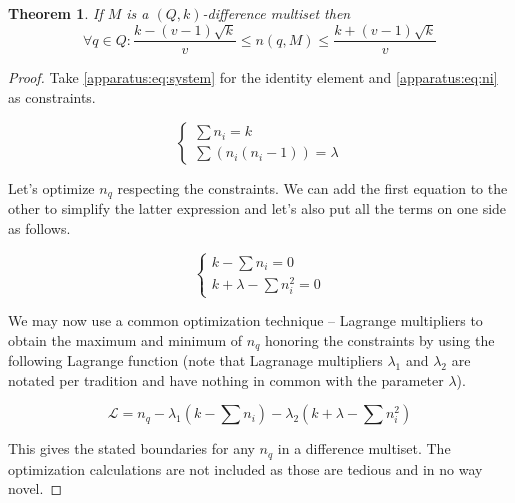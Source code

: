 \documentclass{article}
\theoremstyle{plain}
\newtheorem{theorem}{Theorem}[section]
\theoremstyle{definition}
\theoremstyle{remark}
\begin{document}
            \begin{theorem}
                \label{general:theorem:limits}
                If $M$ is a $(Q,k)$-difference multiset then
                \begin{equation}
                    \forall q \in Q \colon \frac{k-(v-1)\sqrt k}{v} \leq n(q,M) \leq \frac{k+(v-1)\sqrt k}{v}
                \end{equation}
            \end{theorem}
            
            \begin{proof}
                Take \eqref{apparatus:eq:system} for the identity element and \eqref{apparatus:eq:ni} as constraints.
                
                \begin{equation}
                    \begin{cases}
                        \sum {n_i} = k \\
                        \sum (n_i(n_{i}-1)) = \lambda
                    \end{cases}
                \end{equation}
                
                Let's optimize $n_q$ respecting the constraints. We can add the first equation to the other to simplify the latter expression and let's also put all the terms on one side as follows.
                
                \begin{equation}
                    \begin{cases}
                        k - \sum {n_i} = 0 \\
                        k + \lambda - \sum n_i^2 = 0
                    \end{cases}
                \end{equation}
                
                We may now use a common optimization technique -- Lagrange multipliers to obtain the maximum and minimum of $n_q$ honoring the constraints by using the following Lagrange function (note that Lagranage multipliers $\lambda_1$ and $\lambda_2$ are notated per tradition and have nothing in common with the parameter $\lambda$).
                
                \begin{equation}
                    \mathcal L = n_q - \lambda_1 (k - \sum n_i) - \lambda_2 (k + \lambda - \sum n_i^2)
                \end{equation}
                
                This gives the stated boundaries for any $n_q$ in a difference multiset. The optimization calculations are not included as those are tedious and in no way novel.
            \end{proof}
        
\end{document}
